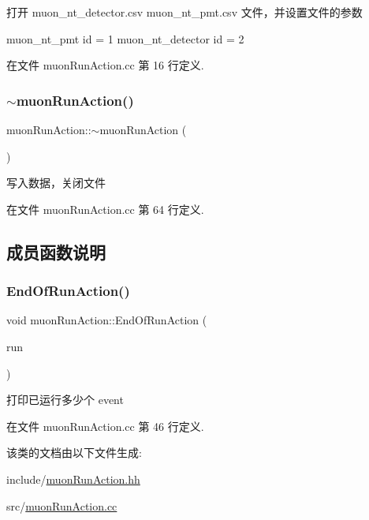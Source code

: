 打开 muon\+\_\+nt\+\_\+detector.\+csv muon\+\_\+nt\+\_\+pmt.\+csv 文件，并设置文件的参数 

muon\+\_\+nt\+\_\+pmt id = 1 muon\+\_\+nt\+\_\+detector id = 2 

在文件 muon\+Run\+Action.\+cc 第 16 行定义.

\mbox{\label{classmuonRunAction_a69aed79e80b3e342a75e210632468c2f}} 
\subsubsection{\texorpdfstring{$\sim$muon\+Run\+Action()}{~muonRunAction()}}
{\footnotesize\ttfamily muon\+Run\+Action\+::$\sim$muon\+Run\+Action (\begin{DoxyParamCaption}{ }\end{DoxyParamCaption})\hspace{0.3cm}{\ttfamily [virtual]}}



写入数据，关闭文件 



在文件 muon\+Run\+Action.\+cc 第 64 行定义.



\subsection{成员函数说明}
\mbox{\label{classmuonRunAction_aa2956c94bf9f6d3c93ac25182dd6a3ba}} 
\subsubsection{\texorpdfstring{End\+Of\+Run\+Action()}{EndOfRunAction()}}
{\footnotesize\ttfamily void muon\+Run\+Action\+::\+End\+Of\+Run\+Action (\begin{DoxyParamCaption}\item[{const G4\+Run $\ast$}]{run }\end{DoxyParamCaption})\hspace{0.3cm}{\ttfamily [virtual]}}



打印已运行多少个 event 



在文件 muon\+Run\+Action.\+cc 第 46 行定义.



该类的文档由以下文件生成\+:\begin{DoxyCompactItemize}
\item 
include/\hyperlink{muonRunAction_8hh}{muon\+Run\+Action.\+hh}\item 
src/\hyperlink{muonRunAction_8cc}{muon\+Run\+Action.\+cc}\end{DoxyCompactItemize}
